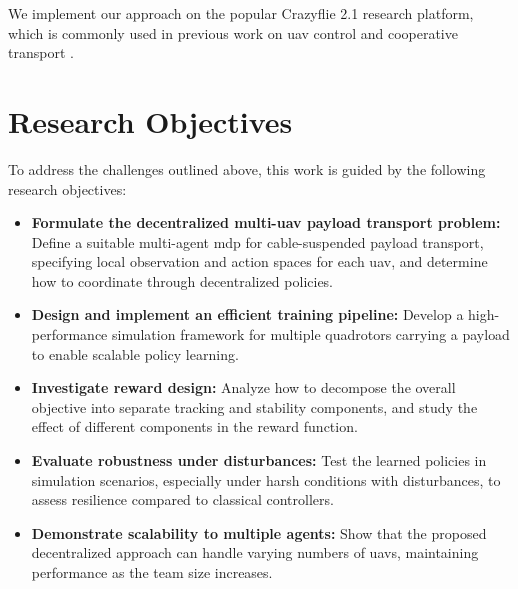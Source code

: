 We implement our approach on the popular Crazyflie 2.1 research platform, which is commonly used in previous work on \gls{uav} control and cooperative transport \autocite{wahba_kinodynamic_2024,huang_collision_2024,Eschmann2024,chen_what_2024}.

\section{Research Objectives}
To address the challenges outlined above, this work is guided by the following research objectives:
\begin{itemize}
    \item \textbf{Formulate the decentralized multi-\gls{uav} payload transport problem:} Define a suitable multi-agent \gls{mdp} for cable-suspended payload transport, specifying local observation and action spaces for each \gls{uav}, and determine how to coordinate through decentralized policies.
    \item \textbf{Design and implement an efficient training pipeline:} Develop a high-performance simulation framework for multiple quadrotors carrying a payload to enable scalable policy learning.
    \item \textbf{Investigate reward design:} Analyze how to decompose the overall objective into separate tracking and stability components, and study the effect of different components in the reward function.
    \item \textbf{Evaluate robustness under disturbances:} Test the learned policies in simulation scenarios, especially under harsh conditions with disturbances, to assess resilience compared to classical controllers.
    \item \textbf{Demonstrate scalability to multiple agents:} Show that the proposed decentralized approach can handle varying numbers of \glspl{uav}, maintaining performance as the team size increases.
\end{itemize}
